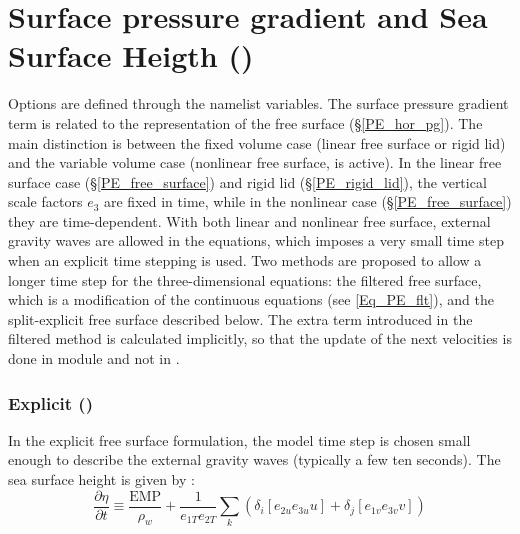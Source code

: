 \section{Surface pressure gradient and Sea Surface Heigth ()}
\label{DYN_hpg_spg}
Options are defined through the   namelist variables.
The surface pressure gradient term is related to the representation of the free surface (\S\ref{PE_hor_pg}). The main distinction is between the fixed volume case (linear free surface or rigid lid) and the variable volume case (nonlinear free surface,  is active). In the linear free surface case (\S\ref{PE_free_surface}) and rigid lid (\S\ref{PE_rigid_lid}), the vertical scale factors $e_{3}$ are fixed in time, while in the nonlinear case (\S\ref{PE_free_surface}) they are time-dependent. With both linear and nonlinear free surface, external gravity waves are allowed in the equations, which imposes a very small time step when an explicit time stepping is used. Two methods are proposed to allow a longer time step for the three-dimensional equations: the filtered free surface, which is a modification of the continuous equations (see \eqref{Eq_PE_flt}), and the split-explicit free surface described below. The extra term introduced in the filtered method is calculated implicitly, so that the update of the next velocities is done in module  and not in .

\subsubsection{Explicit ()}
\label{DYN_spg_exp}

In the explicit free surface formulation, the model time step is chosen small enough to describe the external gravity waves (typically a few ten seconds). The sea surface height is given by :
\begin{equation} \label{Eq_dynspg_ssh}
\frac{\partial \eta }{\partial t}\equiv \frac{\text{EMP}}{\rho _w }+\frac{1}{e_{1T} 
e_{2T} }\sum\limits_k {\left( {\delta _i \left[ {e_{2u} e_{3u} u} 
\right]+\delta _j \left[ {e_{1v} e_{3v} v} \right]} \right)} 
\end{equation}

